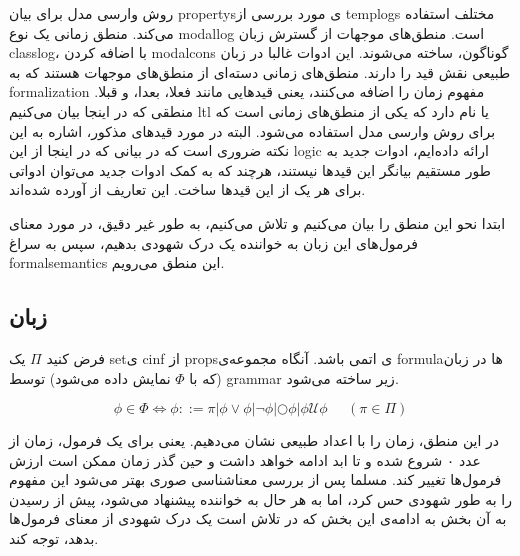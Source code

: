روش وارسی مدل برای بیان \glspl*{property}ی مورد بررسی از \glspl*{templog} مختلف استفاده می‌کند. منطق زمانی یک نوع \gls*{modallog} است. منطق‌های موجهات از گسترش زبان \gls*{classlog}، با اضافه کردن \glspl*{modalcon} گوناگون، ساخته می‌شوند. این ادوات غالبا در زبان طبیعی نقش قید را دارند. منطق‌های زمانی دسته‌ای از منطق‌های موجهات هستند که به \gls*{formalization} مفهوم زمان را اضافه می‌کنند، یعنی قیدهایی مانند فعلا، بعدا، و قبلا. منطقی که در اینجا بیان می‌کنیم \gls{ltl} یا  نام دارد که یکی از منطق‌های زمانی است که برای روش وارسی مدل استفاده می‌شود. البته در مورد قیدهای مذکور، اشاره به این نکته ضروری است که در بیانی که در اینجا از این \gls*{logic} ارائه داده‌ایم، ادوات جدید به‌ طور مستقیم بیانگر این قید‌ها نیستند، هرچند که به کمک ادوات جدید می‌توان ادواتی برای هر یک از این قیدها ساخت.
این تعاریف از \cite{buchi} آورده شده‌اند.

ابتدا نحو این منطق را بیان می‌کنیم و تلاش می‌کنیم، به طور غیر دقیق، در مورد معنای فرمول‌های این زبان به خواننده یک درک شهودی بدهیم، سپس به سراغ \gls*{formalsemantics} این منطق می‌رویم.

\subsection{زبان }
\begin{defn}
	فرض کنید $\Pi$ یک
	 \gls*{set}ی
	  \gls*{cinf} 
	از \glspl*{prop}ی اتمی باشد. آنگاه مجموعه‌ی \gls*{formula}ها در زبان  (که با $\Phi$ نمایش داده می‌شود) توسط \gls*{grammar} زیر ساخته می‌شود.
	
	$$
	\phi \in \Phi \Leftrightarrow
	\phi ::= \pi | \phi \lor \phi |
	\neg \phi |
	\bigcirc \phi |
	\phi \mathcal{U}\phi \;\;\;\;\;(\pi \in \Pi) 
$$	
	
\end{defn}
در این منطق، زمان را با اعداد طبیعی نشان می‌دهیم. یعنی برای یک فرمول، زمان از عدد ۰ شروع شده و تا ابد ادامه خواهد داشت و حین گذر زمان ممکن است ارزش فرمول‌ها تغییر کند. مسلما پس از بررسی معناشناسی صوری بهتر می‌شود این مفهوم را به طور شهودی حس کرد، اما به هر حال به خواننده پیشنهاد می‌شود، پیش از رسیدن به آن بخش به ادامه‌ی این بخش که در تلاش است یک درک شهودی از معنای فرمول‌ها بدهد، توجه کند. 

